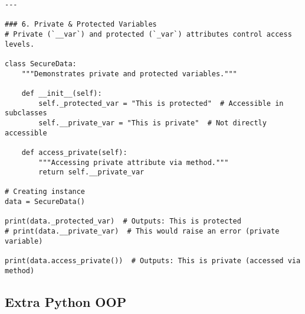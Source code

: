 \begin{verbatim}
---

### 6. Private & Protected Variables
# Private (`__var`) and protected (`_var`) attributes control access levels.

class SecureData:
    """Demonstrates private and protected variables."""

    def __init__(self):
        self._protected_var = "This is protected"  # Accessible in subclasses
        self.__private_var = "This is private"  # Not directly accessible

    def access_private(self):
        """Accessing private attribute via method."""
        return self.__private_var

# Creating instance
data = SecureData()

print(data._protected_var)  # Outputs: This is protected
# print(data.__private_var)  # This would raise an error (private variable)

print(data.access_private())  # Outputs: This is private (accessed via method)
\end{verbatim}

\subsection{Extra Python OOP}

